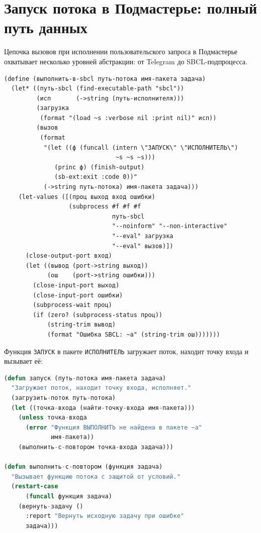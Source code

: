 \documentclass[11pt,a4paper]{article}
\begin{document}
\section{Запуск потока в Подмастерье: полный путь данных}

Цепочка вызовов при исполнении пользовательского запроса в Подмастерье
охватывает несколько уровней абстракции: от Telegram до SBCL-подпроцесса.

\begin{lstlisting}[language=Racket, caption={Исполнение потока: Racket-часть Подмастерья}]
(define (выполнить-в-sbcl путь-потока имя-пакета задача)
  (let* ((путь-sbcl (find-executable-path "sbcl"))
         (исп       (->string (путь-исполнителя)))
         (загрузка
          (format "(load ~s :verbose nil :print nil)" исп))
         (вызов
          (format
           "(let ((ф (funcall (intern \"ЗАПУСК\" \"ИСПОЛНИТЕЛЬ\")
                               ~s ~s ~s)))
              (princ ф) (finish-output)
              (sb-ext:exit :code 0))"
           (->string путь-потока) имя-пакета задача)))
    (let-values ([(проц выход вход ошибки)
                  (subprocess #f #f #f
                              путь-sbcl
                              "--noinform" "--non-interactive"
                              "--eval" загрузка
                              "--eval" вызов)])
      (close-output-port вход)
      (let ((вывод (port->string выход))
            (ош    (port->string ошибки)))
        (close-input-port выход)
        (close-input-port ошибки)
        (subprocess-wait проц)
        (if (zero? (subprocess-status проц))
            (string-trim вывод)
            (format "Ошибка SBCL: ~a" (string-trim ош)))))))
\end{lstlisting}

Функция \texttt{ЗАПУСК} в пакете \texttt{ИСПОЛНИТЕЛЬ} загружает поток,
находит точку входа и вызывает её:

\begin{lstlisting}[language=CommonLisp, caption={Функция ЗАПУСК в исполнителе (CL)}]
(defun запуск (путь-потока имя-пакета задача)
  "Загружает поток, находит точку входа, исполняет."
  (загрузить-поток путь-потока)
  (let ((точка-входа (найти-точку-входа имя-пакета)))
    (unless точка-входа
      (error "Функция ВЫПОЛНИТЬ не найдена в пакете ~a"
             имя-пакета))
    (выполнить-с-повтором точка-входа задача)))

(defun выполнить-с-повтором (функция задача)
  "Вызывает функцию потока с защитой от условий."
  (restart-case
      (funcall функция задача)
    (вернуть-задачу ()
      :report "Вернуть исходную задачу при ошибке"
      задача)))
\end{lstlisting}
\end{document}
